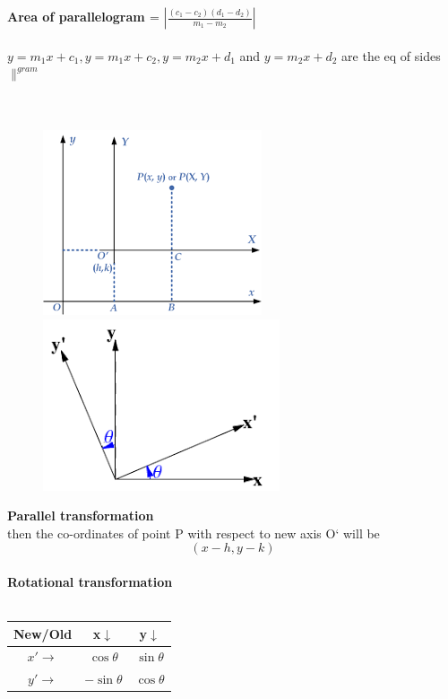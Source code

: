 \documentclass[11pt,a4paper,landscape]{article}
\begin{document}
\begin{multicols*}{3}
{\bfseries { Area of parallelogram }}  = $ \left | \frac{(c_1 - c_2)(d_1 - d_2)}{m_1-m_2} \right |$\\ \\
$y=m_1 x+c_1, y=m_1 x+c_2,y=m_2 x+d_1$ and $y=m_2 x+d_2$ are the eq of sides $\parallel^{gram}$\\ \\
%
%
%
{\bfseries {}}\\
\begin{figure}
\centering
\includegraphics [scale=0.4]{parallel_trans}\\
\includegraphics [scale=0.4]{rotational_trans}\\
\end{figure}
%
{\bfseries { Parallel transformation }}\\
then the co-ordinates of point P with respect to new axis O` will be $$(x-h,y-k)$$
\\ 
%
{\bfseries { Rotational transformation }}\\\\
\begin{tabular}{|| c || c | c|| }
\hline 
 New/Old & x$\downarrow$ & y$\downarrow$ \\[0.5ex]
\hline \hline
 $x'\rightarrow$ & $\cos\theta  $ & $\sin\theta$\\  
 $y'\rightarrow$ & $-\sin\theta  $ & $\cos\theta$\\
\hline
\end{tabular}
\end{multicols*}
\end{document}
